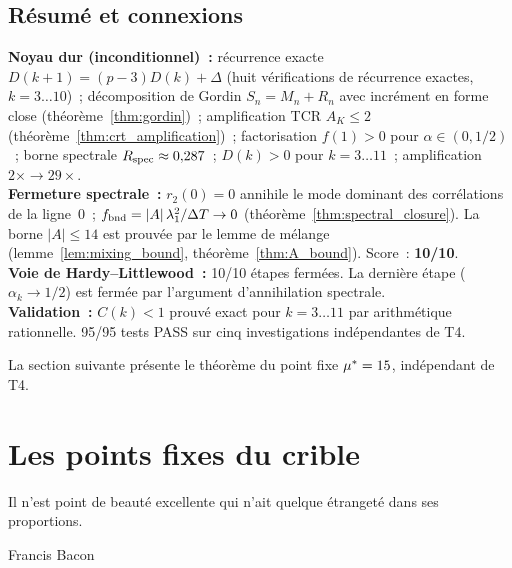 \documentclass[12pt,a4paper]{article}
\begin{document}
\subsection{Résumé et connexions}
\label{sec:ch7_summary}

\begin{ledgerbox}
\textbf{Noyau dur (inconditionnel)~:} récurrence exacte
  $D(k+1) = (p-3)D(k) + \Delta$ (huit vérifications de récurrence
  exactes, $k = 3\ldots 10$)~; décomposition de Gordin
  $S_n = M_n + R_n$ avec incrément en forme close
  (théorème~\ref{thm:gordin})~; amplification TCR $A_K \leq 2$
  (théorème~\ref{thm:crt_amplification})~; factorisation $f(1) > 0$
  pour $\alpha \in (0,1/2)$~; borne spectrale
  $R_{\rm spec} \approx 0{,}287$~; $D(k) > 0$ pour
  $k = 3\ldots 11$~; amplification $2\times \to 29\times$.\\[4pt]
\textbf{Fermeture spectrale~:} $r_2(0) = 0$ annihile le mode
  dominant des corrélations de la ligne~$0$~;
  $f_{\rm bnd} = |A|\,\lambda_1^2/\Delta T \to 0$
  (théorème~\ref{thm:spectral_closure}). La borne $|A| \leq 14$ est
  prouvée par le lemme de mélange (lemme~\ref{lem:mixing_bound},
  théorème~\ref{thm:A_bound}). Score~: \textbf{10/10}.\\[4pt]
\textbf{Voie de Hardy--Littlewood~:} 10/10 étapes fermées. La
  dernière étape ($\alpha_k \to 1/2$) est fermée par l'argument
  d'annihilation spectrale.\\[4pt]
\textbf{Validation~:} $C(k) < 1$ prouvé exact pour $k = 3\ldots 11$
  par arithmétique rationnelle. 95/95 tests PASS sur cinq
  investigations indépendantes de T4.
\end{ledgerbox}

\medskip
La section suivante présente le théorème du point fixe
${\mu^{*}} = 15$, indépendant de T4.


\newpage

\section{Les points fixes du crible}
\label{sec:fixed_point}

\epigraph{Il n'est point de beauté excellente qui n'ait quelque
étrangeté dans ses proportions.}{Francis Bacon}
\end{document}
